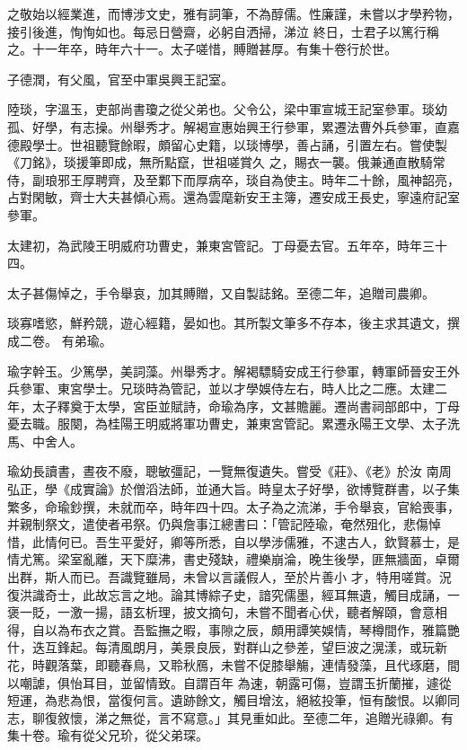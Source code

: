 \begin{pinyinscope}
 之敬始以經業進，而博涉文史，雅有詞筆，不為醇儒。性廉謹，未嘗以才學矜物，接引後進，恂恂如也。每忌日營齋，必躬自洒掃，涕泣
 終日，士君子以篤行稱之。十一年卒，時年六十一。太子嗟惜，賻贈甚厚。有集十卷行於世。



 子德潤，有父風，官至中軍吳興王記室。



 陸琰，字溫玉，吏部尚書瓊之從父弟也。父令公，梁中軍宣城王記室參軍。琰幼孤、好學，有志操。州舉秀才。解褐宣惠始興王行參軍，累遷法曹外兵參軍，直嘉德殿學士。世祖聽覽餘暇，頗留心史籍，以琰博學，善占誦，引置左右。嘗使製《刀銘》，琰援筆即成，無所點竄，世祖嗟賞久
 之，賜衣一襲。俄兼通直散騎常侍，副琅邪王厚聘齊，及至鄴下而厚病卒，琰自為使主。時年二十餘，風神韶亮，占對閑敏，齊士大夫甚傾心焉。還為雲麾新安王主簿，遷安成王長史，寧遠府記室參軍。



 太建初，為武陵王明威府功曹史，兼東宮管記。丁母憂去官。五年卒，時年三十四。



 太子甚傷悼之，手令舉哀，加其賻贈，又自製誌銘。至德二年，追贈司農卿。



 琰寡嗜慾，鮮矜競，遊心經籍，晏如也。其所製文筆多不存本，後主求其遺文，撰成二卷。
 有弟瑜。



 瑜字幹玉。少篤學，美詞藻。州舉秀才。解褐驃騎安成王行參軍，轉軍師晉安王外兵參軍、東宮學士。兄琰時為管記，並以才學娛侍左右，時人比之二應。太建二年，太子釋奠于太學，宮臣並賦詩，命瑜為序，文甚贍麗。遷尚書祠部郎中，丁母憂去職。服闋，為桂陽王明威將軍功曹史，兼東宮管記。累遷永陽王文學、太子洗馬、中舍人。



 瑜幼長讀書，晝夜不廢，聰敏彊記，一覽無復遺失。嘗受《莊》、《老》於汝
 南周弘正，學《成實論》於僧滔法師，並通大旨。時皇太子好學，欲博覽群書，以子集繁多，命瑜鈔撰，未就而卒，時年四十四。太子為之流涕，手令舉哀，官給喪事，并親制祭文，遣使者弔祭。仍與詹事江總書曰：「管記陸瑜，奄然殂化，悲傷悼惜，此情何已。吾生平愛好，卿等所悉，自以學涉儒雅，不逮古人，欽賢慕士，是情尤篤。梁室亂離，天下糜沸，書史殘缺，禮樂崩淪，晚生後學，匪無牆面，卓爾出群，斯人而已。吾識覽雖局，未曾以言議假人，至於片善小
 才，特用嗟賞。況復洪識奇士，此故忘言之地。論其博綜子史，諳究儒墨，經耳無遺，觸目成誦，一褒一貶，一激一揚，語玄析理，披文摘句，未嘗不聞者心伏，聽者解頤，會意相得，自以為布衣之賞。吾監撫之暇，事隙之辰，頗用譚笑娛情，琴樽間作，雅篇艷什，迭互鋒起。每清風朗月，美景良辰，對群山之參差，望巨波之滉漾，或玩新花，時觀落葉，即聽春鳥，又聆秋鴈，未嘗不促膝舉觴，連情發藻，且代琢磨，間以嘲謔，俱怡耳目，並留情致。自謂百年
 為速，朝露可傷，豈謂玉折蘭摧，遽從短運，為悲為恨，當復何言。遺跡餘文，觸目增泫，絕絃投筆，恒有酸恨。以卿同志，聊復敘懷，涕之無從，言不寫意。」其見重如此。至德二年，追贈光祿卿。有集十卷。瑜有從父兄玠，從父弟琛。




\end{pinyinscope}

